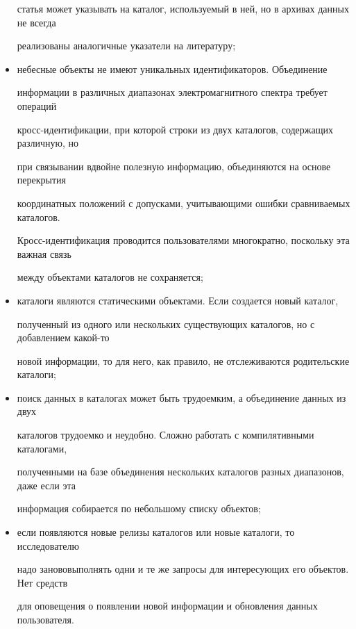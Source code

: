 \begin{multicols}{2}
\begin{itemize}
статья может указывать на каталог, используемый в ней, но в архивах данных не всегда 

реализованы аналогичные указатели на литературу;\\[-15pt]

  \item небесные объекты не имеют уникальных идентификаторов. Объединение 

информации в различных диапазонах электромагнитного спектра требует операций 

  кросс-идентификации, при которой строки из двух каталогов, содержащих различную, но 

при связывании вдвойне полезную информацию, объединяются на основе перекрытия 

координатных положений с допусками, учитывающими ошибки сравниваемых каталогов. 

Кросс-идентификация проводится пользователями многократно, поскольку эта важная связь 

между объектами каталогов не сохраняется;\\[-15pt] 

  \item каталоги являются статическими объектами. Ес\-ли создается новый каталог, 

полученный из одного или нескольких существующих каталогов, но с добавлением какой-то 

новой информации, то для него, как правило, не отслеживаются родительские каталоги;\\[-15pt]

  \item поиск данных в каталогах может быть трудоемким, а объединение данных из двух 

каталогов трудоемко и неудобно. Сложно работать с компилятивными каталогами, 

полученными на базе объединения нескольких каталогов разных диапазонов, даже если эта 

информация собирается по небольшому списку объектов;\\[-14pt]

  \item если появляются новые релизы каталогов или новые каталоги, то исследователю 

надо заново\linebreak выполнять одни и те же запросы для ин\-те\-ре\-су\-ющих его объектов. Нет средств 

для оповещения о появлении новой информации и об\-нов\-ле\-ния данных пользователя.


\end{itemize}
\end{multicols}
